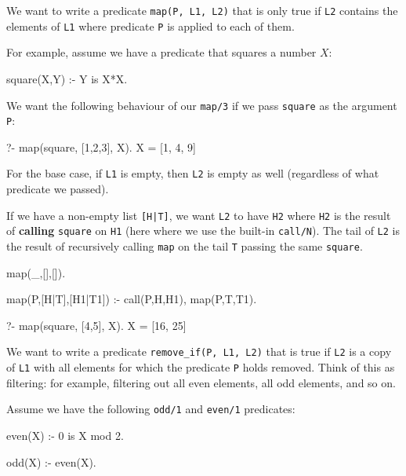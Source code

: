 
We want to write a predicate \texttt{map(P, L1, L2)} that is only true if \texttt{L2} contains the elements of \texttt{L1} where predicate \texttt{P} is applied to each of them. 

For example, assume we have a predicate that squares a number $X$:
\begin{codeblock}
square(X,Y) :- Y is X*X.
\end{codeblock}

We want the following behaviour of our \texttt{map/3} if we pass \texttt{square} as the argument \texttt{P}:

\begin{codeblock}
?- map(square, [1,2,3], X).
X = [1, 4, 9]
\end{codeblock}

For the base case, if \texttt{L1} is empty, then \texttt{L2} is empty as well (regardless of what predicate we passed).

If we have a non-empty list \texttt{[H|T]}, we want \texttt{L2} to have \texttt{H2} where \texttt{H2} is the result of \textbf{calling} \texttt{square} on \texttt{H1} (here where we use the built-in \texttt{call/N}). The tail of \texttt{L2} is the result of recursively calling \texttt{map} on the tail \texttt{T} passing the same \texttt{square}.


\begin{codeblock}
map(_,[],[]).

map(P,[H|T],[H1|T1]) :-
    call(P,H,H1),
    map(P,T,T1).
\end{codeblock}

\begin{codeblock}
?- map(square, [4,5], X).
X = [16, 25]
\end{codeblock}


We want to write a predicate \texttt{remove\_if(P, L1, L2)} that is true if \texttt{L2} is a copy of \texttt{L1} with all elements for which the predicate \texttt{P} holds removed. Think of this as filtering: for example, filtering out all even elements, all odd elements, and so on.

Assume we have the following \texttt{odd/1} and \texttt{even/1} predicates:

\begin{codeblock}
even(X) :- 0 is X mod 2.

odd(X) :- \+ even(X).
\end{codeblock}

